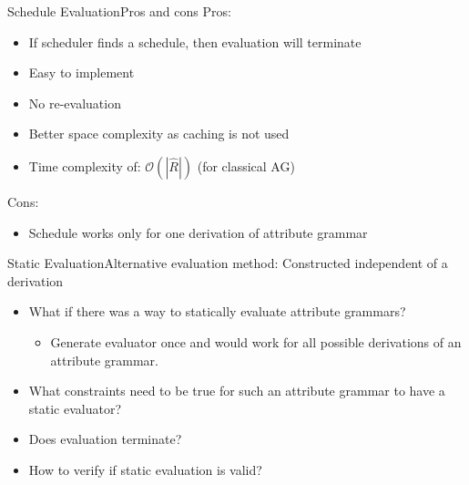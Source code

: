 



\begin{frame}{Schedule Evaluation}{Pros and cons}
Pros:
\begin{itemize}
    \item If scheduler finds a schedule, then evaluation \alert{will terminate}
    \item Easy to implement
    \item \alert{No re-evaluation}
    \item Better space complexity as caching is not used
    \item Time complexity of: $\mathcal{O}(| \hat{R} |)$ (for classical AG)
\end{itemize}

Cons:
\begin{itemize}
    \item Schedule \alert{works only for one derivation} of attribute grammar
\end{itemize}
\end{frame}







\begin{frame}{Static Evaluation}{Alternative evaluation method: Constructed independent of a derivation}

\begin{itemize}
    \item What if there was a way to \alert{statically} evaluate attribute grammars?
    \begin{itemize}
        \item Generate evaluator \alert{once} and would \alert{work for all possible derivations} of an attribute grammar.
    \end{itemize}
    \item What \alert{constraints} need to be true for such an attribute grammar to have a static evaluator?
    \item Does evaluation \alert{terminate}?
    \item How to verify if static evaluation is \alert{valid}?
\end{itemize}
\end{frame}

